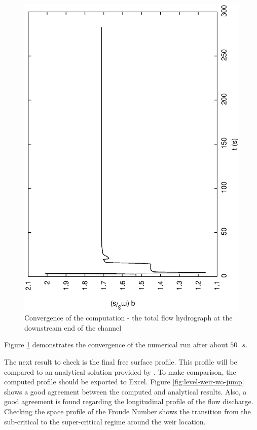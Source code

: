 \documentclass[a4paper,12pt]{article}
\begin{document}
\begin{figure}[h]
  \begin{center}
  \includegraphics[scale=0.5,angle=-90]{Qsanschoc}
  \caption{Convergence of the computation - the total flow hydrograph at the downstream end of the channel}
  \label{fig:Conv-weir-wo-jump}
  \end{center}
\end{figure}

Figure \ref{fig:Conv-weir-wo-jump} demonstrates the convergence of the numerical run after about $50\mbox{ }s$.

\vspace{0.5cm}

The next result to check is the final free surface profile. This profile will be compared to an
analytical solution provided by \cite{GOUTAL96}.
To make comparison, the computed profile should be exported to Excel.
Figure \ref{fig:level-weir-wo-jump} shows a good agreement
between the computed and analytical results. Also, a good agreement
is found regarding the longitudinal profile of the flow discharge. 
Checking the space profile of the Froude Number shows the transition
from the sub-critical to the super-critical regime around the weir location.
\end{document}
